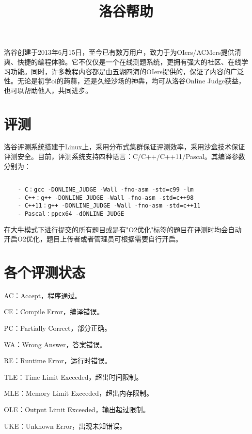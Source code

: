 \documentclass[10pt,a4paper]{article}
\title{\textbf{洛谷\quad 帮助}}
\date{}
\begin{document}
	\maketitle\tableofcontents\newpage
	
	
	洛谷创建于2013年6月15日，至今已有数万用户，致力于为OIers/ACMers提供清爽、快捷的编程体验。它不仅仅是一个在线测题系统，更拥有强大的社区、在线学习功能。同时，许多教程内容都是由五湖四海的OIers提供的，保证了内容的广泛性。无论是初学oi的蒟蒻，还是久经沙场的神犇，均可从洛谷Online 
	Judge获益，也可以帮助他人，共同进步。
	
	\section{
		评测}
	
	
	洛谷评测系统搭建于Linux上，采用分布式集群保证评测效率，采用沙盒技术保证评测安全。目前，评测系统支持四种语言：C/C++/C++11/Pascal。其编译参数分别为：
	\begin{verbatim}
	
	- C：gcc -DONLINE_JUDGE -Wall -fno-asm -std=c99 -lm
	- C++：g++ -DONLINE_JUDGE -Wall -fno-asm -std=c++98 
	- C++11：g++ -DONLINE_JUDGE -Wall -fno-asm -std=c++11
	- Pascal：ppcx64 -dONLINE_JUDGE\end{verbatim}
	
	
	在大牛模式下进行提交的所有题目或是有"O2优化"标签的题目在评测时均会自动开启O2优化，题目上传者或者管理员可根据需要自行开启。
	
	\section{
		各个评测状态}
	\begin{itemize}{
			\item 
			
			AC：Accept，程序通过。
			\item 
			
			CE：Compile 
			Error，编译错误。
			\item 
			
			PC：Partially 
			Correct，部分正确。
			\item 
			
			WA：Wrong 
			Answer，答案错误。
			\item 
			
			RE：Runtime 
			Error，运行时错误。
			\item 
			
			TLE：Time Limit 
			Exceeded，超出时间限制。
			\item 
			
			MLE：Memory Limit 
			Exceeded，超出内存限制。
			\item 
			
			OLE：Output Limit 
			Exceeded，输出超过限制。
			\item UKE：Unknown Error，出现未知错误。}
	\end{itemize}
	
\end{document}
